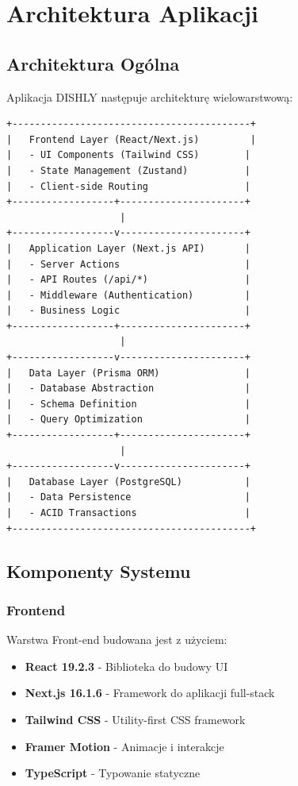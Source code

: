 \documentclass[12pt,a4paper,utf-8]{article}
\begin{document}
\newpage

\section{Architektura Aplikacji}

\subsection{Architektura Ogólna}

Aplikacja DISHLY następuje architekturę wielowarstwową:

\begin{verbatim}
+------------------------------------------+
|   Frontend Layer (React/Next.js)         |
|   - UI Components (Tailwind CSS)        |
|   - State Management (Zustand)          |
|   - Client-side Routing                 |
+------------------+----------------------+
                    |
+------------------v----------------------+
|   Application Layer (Next.js API)       |
|   - Server Actions                      |
|   - API Routes (/api/*)                 |
|   - Middleware (Authentication)         |
|   - Business Logic                      |
+------------------+----------------------+
                    |
+------------------v----------------------+
|   Data Layer (Prisma ORM)               |
|   - Database Abstraction                |
|   - Schema Definition                   |
|   - Query Optimization                  |
+------------------+----------------------+
                    |
+------------------v----------------------+
|   Database Layer (PostgreSQL)           |
|   - Data Persistence                    |
|   - ACID Transactions                   |
+------------------------------------------+
\end{verbatim}

\subsection{Komponenty Systemu}

\subsubsection{Frontend}

Warstwa Front-end budowana jest z użyciem:
\begin{itemize}
    \item \textbf{React 19.2.3}  -  Biblioteka do budowy UI
    \item \textbf{Next.js 16.1.6}  -  Framework do aplikacji full-stack
    \item \textbf{Tailwind CSS}  -  Utility-first CSS framework
    \item \textbf{Framer Motion}  -  Animacje i interakcje
    \item \textbf{TypeScript}  -  Typowanie statyczne
\end{itemize}
\end{document}
